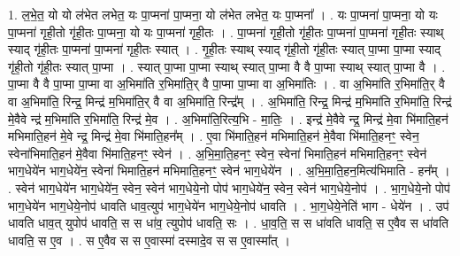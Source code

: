 \documentclass[17pt]{extarticle}
\begin{document}
1. ल॒भे॒त॒ यो यो ल॑भेत लभेत॒ यः पा॒प्मना॑ पा॒प्मना॒ यो ल॑भेत लभेत॒ यः पा॒प्मना᳚ । . यः पा॒प्मना॑ पा॒प्मना॒ यो यः पा॒प्मना॑ गृही॒तो गृ॑ही॒तः पा॒प्मना॒ यो यः पा॒प्मना॑ गृही॒तः । . पा॒प्मना॑ गृही॒तो गृ॑ही॒तः पा॒प्मना॑ पा॒प्मना॑ गृही॒तः स्याथ् स्याद् गृ॑ही॒तः पा॒प्मना॑ पा॒प्मना॑ गृही॒तः स्यात् । . गृ॒ही॒तः स्याथ् स्याद् गृ॑ही॒तो गृ॑ही॒तः स्यात् पा॒प्मा पा॒प्मा स्याद् गृ॑ही॒तो गृ॑ही॒तः स्यात् पा॒प्मा । . स्यात् पा॒प्मा पा॒प्मा स्याथ् स्यात् पा॒प्मा वै वै पा॒प्मा स्याथ् स्यात् पा॒प्मा वै । . पा॒प्मा वै वै पा॒प्मा पा॒प्मा वा अ॒भिमा॑ति र॒भिमा॑ति॒र् वै पा॒प्मा पा॒प्मा वा अ॒भिमा॑तिः । . वा अ॒भिमा॑ति र॒भिमा॑ति॒र् वै वा अ॒भिमा॑ति॒ रिन्द्र॒ मिन्द्र॑ म॒भिमा॑ति॒र् वै वा अ॒भिमा॑ति॒ रिन्द्र᳚म् । . अ॒भिमा॑ति॒ रिन्द्र॒ मिन्द्र॑ म॒भिमा॑ति र॒भिमा॑ति॒ रिन्द्र॑ मे॒वैवे न्द्र॑ म॒भिमा॑ति र॒भिमा॑ति॒ रिन्द्र॑ मे॒व । . अ॒भिमा॑ति॒रित्य॒भि - मा॒तिः॒ । . इन्द्र॑ मे॒वैवे न्द्र॒ मिन्द्र॑ मे॒वा भि॑माति॒हन॑ मभिमाति॒हन॑ मे॒वे न्द्र॒ मिन्द्र॑ मे॒वा भि॑माति॒हन᳚म् । . ए॒वा भि॑माति॒हन॑ मभिमाति॒हन॑ मे॒वैवा भि॑माति॒हनꣳ॒॒ स्वेन॒ स्वेना॑भिमाति॒हन॑ मे॒वैवा भि॑माति॒हनꣳ॒॒ स्वेन॑ । . अ॒भि॒मा॒ति॒हनꣳ॒॒ स्वेन॒ स्वेना॑ भिमाति॒हन॑ मभिमाति॒हनꣳ॒॒ स्वेन॑ भाग॒धेये॑न भाग॒धेये॑न॒ स्वेना॑ भिमाति॒हन॑ मभिमाति॒हनꣳ॒॒ स्वेन॑ भाग॒धेये॑न । . अ॒भि॒मा॒ति॒हन॒मित्य॑भिमाति - हन᳚म् । . स्वेन॑ भाग॒धेये॑न भाग॒धेये॑न॒ स्वेन॒ स्वेन॑ भाग॒धेये॒नो पोप॑ भाग॒धेये॑न॒ स्वेन॒ स्वेन॑ भाग॒धेये॒नोप॑ । . भा॒ग॒धेये॒नो पोप॑ भाग॒धेये॑न भाग॒धेये॒नोप॑ धावति धाव॒त्युप॑ भाग॒धेये॑न भाग॒धेये॒नोप॑ धावति । . भा॒ग॒धेये॒नेति॑ भाग - धेये॑न । . उप॑ धावति धाव॒त् युपोप॑ धावति॒ स स धा॑व॒ त्युपोप॑ धावति॒ सः । . धा॒व॒ति॒ स स धा॑वति धावति॒ स ए॒वैव स धा॑वति धावति॒ स ए॒व । . स ए॒वैव स स ए॒वास्मा॑ दस्मादे॒व स स ए॒वास्मा᳚त् । \newline
\end{document}
